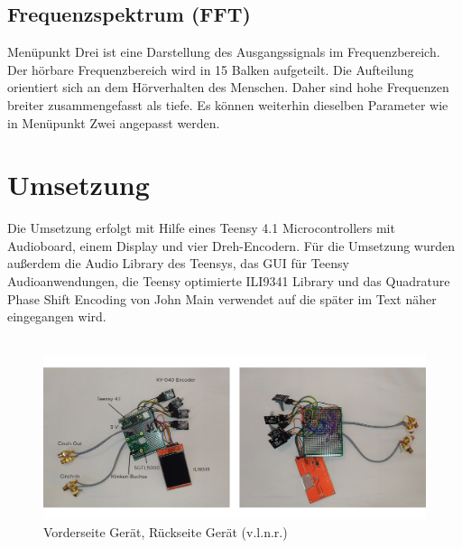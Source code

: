 \documentclass[12pt]{article}
\begin{document}
\subsection{Frequenzspektrum (FFT)}
Menüpunkt Drei ist eine Darstellung des Ausgangssignals im Frequenzbereich. 
Der hörbare Frequenzbereich wird in 15 Balken aufgeteilt. Die Aufteilung orientiert sich an dem Hörverhalten des Menschen. 
Daher sind hohe Frequenzen breiter zusammengefasst als tiefe. 
Es können weiterhin dieselben Parameter wie in Menüpunkt Zwei angepasst werden.
\section{Umsetzung}
Die Umsetzung erfolgt mit Hilfe eines Teensy 4.1 Microcontrollers mit Audioboard, einem Display und vier Dreh-Encodern.
Für die Umsetzung wurden außerdem die Audio Library des Teensys, das GUI für Teensy Audioanwendungen, die Teensy optimierte ILI9341 Library und das Quadrature Phase Shift Encoding von John Main verwendet auf die später im Text näher eingegangen wird.
\\
\\
\begin{figure}[h]
  \centering
  \includegraphics[width=\textwidth]{ITS_KomplettesGeraet.jpg}
  \caption{Vorderseite Gerät, Rückseite Gerät (v.l.n.r.)}
\end{figure}
\newpage
\end{document}
